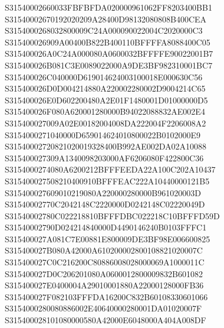 \documentclass[12pt,a4paper]{article}
\begin{document}
\begin{framed}
{S31540002660033FBFBFDA020000961062FF8203400BB1\newline
S31540002670192020209A28400D98132080808B400CEA\newline
S3154000268032800009C24A000090022004C2020000C3\newline
S315400026909A00400B822B400110BFFFFA8088400C05\newline
S315400026A0C24A000080A0600032BFFFFE90022001B7\newline
S315400026B081C3E0089022000A9DE3BF982310001BC7\newline
S315400026C040000D619014624003100018E000630C56\newline
S315400026D0D004214880A220002280002D9004214C65\newline
S315400026E0D602200480A2E01F1480001D01000000D5\newline
S315400026F080A620001280000B94022088832AE002E4\newline
S315400027009A02E00182004008DA222004F2206008A2\newline
S3154000271040000D659014624010800022B0102000E9\newline
S31540002720821020019328400B992AE002DA02A10088\newline
S315400027309A1340098203000AF6206080F422800C36\newline
S3154000274080A6200212BFFFEEDA22A100C202A10437\newline
S315400027508210400910BFFFEAC222A10440000121B5\newline
S315400027609010219080A220000280000B961020003D\newline
S31540002770C2042148C2220000D0242148C02220049D\newline
S31540002780C022218810BFFFDBC022218C10BFFFD59D\newline
S31540002790D024214840000D4490146240B0103FFFC1\newline
S315400027A081C7E00881E800009DE3BF98E006600825\newline
S315400027B080A42000A610200002800108821020007C\newline
S315400027C0C216200C80886008028000069A1000011C\newline
S315400027D0C206201080A0600012800009832B601082\newline
S315400027E0400004A29010001880A22000128000FB36\newline
S315400027F082103FFFDA16200C832B60108330601066\newline
S3154000280080886002E40640000280001DA01020007F\newline
S315400028101080000580A42000E6048000A404A008DF\newline
}
\end{framed}
\end{document}
